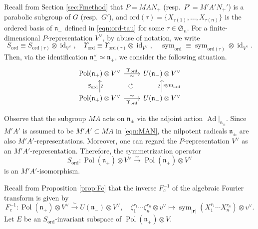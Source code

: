 \documentclass[a4paper,11pt,reqno]{amsart}
\newcommand{\frakn}{\mathfrak{n}}
\newcommand{\0}{{\bf 0}}
\newcommand{\1}{{\bf 1}}
\DeclareMathOperator{\Ad}{Ad}
\DeclareMathOperator{\Pol}{Pol}
\DeclareMathOperator{\id}{id}
\newcommand{\ord}{{\mathrm{ord}}}
\DeclareMathOperator{\To}{\longrightarrow}
\DeclareMathOperator{\sym}{sym}
\theoremstyle{plain}
\theoremstyle{definition}
\numberwithin{equation}{section}
\theoremstyle{definition}
\begin{document}
Recall from Section \ref{sec:Fmethod} that 
$P=MAN_+$ (resp.\ $P'=M'A'N_+'$) is a parabolic subgroup of $G$ (resp.\ $G'$),
and $\ord(\tau)=\{X_{\tau(1)},\ldots, X_{\tau(n)}\}$ is the ordered basis
of $\frakn_-$
defined in \eqref{eqn:ord-tau} for some $\tau \in \mathfrak{S}_n$.
For a finite-dimensional $P$-representation $V^\vee$, 
by abuse of notation, we write
\begin{equation*}
S_\ord\equiv S_{\ord(\tau)}\otimes \id_{V^\vee}, \quad
\Upsilon_\ord\equiv \Upsilon_{\ord(\tau)}\otimes \id_{V^\vee}, \quad
\sym_\ord \equiv \sym_{\ord(\tau)}\otimes \id_{V^\vee}.
\end{equation*}
Then, via the identification $\frakn_-^\vee \simeq \frakn_+$,
we consider the following situation.
\begin{equation*}
\begin{tikzcd}
	{\Pol(\frakn_+)\otimes V^\vee}& {U(\frakn_-)\otimes V^\vee}
	\arrow[dl, pos=0.5, phantom, "\circlearrowleft"] \\
	{\Pol(\frakn_+)\otimes V^\vee} & {U(\frakn_-)\otimes V^\vee}
	\arrow["{\Upsilon_{\ord}}", "\sim"' sloped, from=1-1, to=1-2]
	\arrow["{S_{\ord}}","\sim"' sloped,  from=2-1, to=1-1]
	\arrow["\sim" sloped, "\sym_{\ord}"',  from=2-2, to=1-2]
	\arrow["\sim" sloped,"{\Upsilon_{\ord}}"', from=2-1, to=2-2]
\end{tikzcd}
\end{equation*}


Observe that the subgroup $MA$ acts on $\frakn_{\pm}$ 
via the adjoint action $\Ad\vert_{\frakn_{\pm}}$.
 Since $M'A'$ is assumed to be $M'A' \subset MA$ 
in \eqref{eqn:MAN}, the nilpotent radicals $\frakn_{\pm}$ are also 
$M'A'$-representations. Moreover, one can regard the $P$-representation
$V^\vee$ as an $M'A'$-representation.
Therefore, 
the symmetrization operator
\begin{equation*}
S_{\ord}
\colon \Pol(\frakn_+)\otimes V^\vee \stackrel{\sim}{\To} \Pol(\frakn_+)\otimes V^\vee
\end{equation*}
is an $M'A'$-isomorphism.


Recall from Proposition \ref{prop:Fc} that
the inverse $F_c^{-1}$ of the algebraic Fourier transform is given by
\begin{equation}\label{eqn:Fc2}
F_c^{-1}\colon \Pol(\frakn_+)\otimes V^\vee 
\stackrel{\sim}{\To} U(\frakn_-)\otimes V^\vee,
\quad 
\zeta_1^{r_1}\cdots \zeta_n^{r_n}\otimes v^\vee
\mapsto
\sym_{|\mathbf{r}|}(X_1^{r_1}\cdots X_n^{r_n}) \otimes v^\vee.
\end{equation}
Let $E$ be an $S_\ord$-invariant subspace 
of $\Pol(\frakn_+)\otimes V$.
\end{document}
